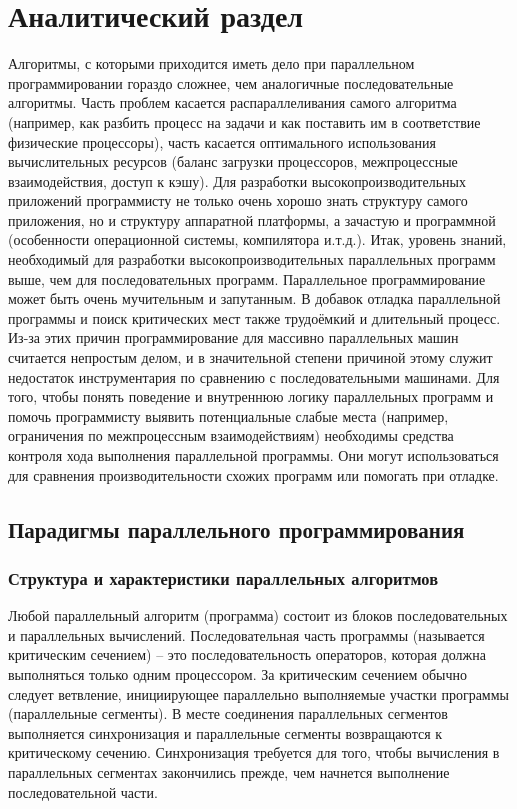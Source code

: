 \chapter{Аналитический раздел}
\label{cha:analysis}
%
%
Алгоритмы, с которыми приходится иметь дело при параллельном программировании гораздо сложнее, чем аналогичные последовательные алгоритмы. Часть проблем касается распараллеливания самого алгоритма (например, как разбить процесс на задачи и как поставить им в соответствие физические процессоры), часть касается оптимального использования вычислительных ресурсов (баланс загрузки процессоров, межпроцессные взаимодействия, доступ к кэшу). Для разработки высокопроизводительных приложений программисту не только очень хорошо знать структуру самого приложения, но и структуру аппаратной платформы, а зачастую и программной (особенности операционной системы, компилятора и.т.д.).
Итак, уровень знаний, необходимый для разработки высокопроизводительных параллельных программ выше, чем для последовательных программ. Параллельное программирование может быть очень мучительным и запутанным. В добавок отладка параллельной программы и поиск критических мест также трудоёмкий и длительный процесс.
Из-за этих причин программирование для массивно параллельных машин считается непростым делом, и в значительной степени причиной этому служит недостаток инструментария по сравнению с последовательными машинами. Для того, чтобы понять поведение и внутреннюю логику параллельных программ и помочь программисту выявить потенциальные слабые места (например, ограничения по межпроцессным взаимодействиям) необходимы средства контроля хода выполнения параллельной программы. Они могут использоваться для сравнения производительности схожих программ или помогать при отладке.





\section{Парадигмы параллельного программирования}
\subsection{Структура и характеристики параллельных алгоритмов}
Любой параллельный алгоритм (программа) состоит из блоков последовательных и параллельных вычислений. Последовательная часть программы (называется критическим сечением) – это последовательность операторов, которая должна выполняться только одним процессором. За критическим сечением обычно следует ветвление, инициирующее параллельно выполняемые участки программы (параллельные сегменты). В месте соединения параллельных сегментов выполняется синхронизация и параллельные сегменты возвращаются к критическому сечению. Синхронизация требуется для того, чтобы вычисления в параллельных сегментах закончились прежде, чем начнется выполнение последовательной части. 

